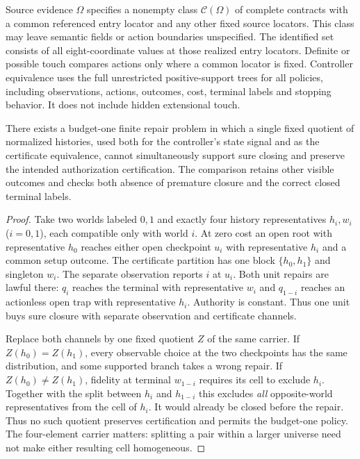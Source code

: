 Source evidence \(\Omega\) specifies a nonempty class \(\mathcal C(\Omega)\) of complete contracts with a common referenced entry locator and any other fixed source locators. This class may leave semantic fields or action boundaries unspecified. The identified set consists of all eight-coordinate values at those realized entry locators. Definite or possible touch compares actions only where a common locator is fixed. Controller equivalence uses the full unrestricted positive-support trees for all policies, including observations, actions, outcomes, cost, terminal labels and stopping behavior. It does not include hidden extensional touch.

\begin{proposition}\label{found:p01}

There exists a budget-one finite repair problem in which a single fixed quotient of normalized histories, used both for the controller's state signal and as the certificate equivalence, cannot simultaneously support sure closing and preserve the intended authorization certification. The comparison retains other visible outcomes and checks both absence of premature closure and the correct closed terminal labels.

\end{proposition}

\begin{proof}

Take two worlds labeled \(0,1\) and exactly four history representatives \(h_i,w_i\) (\(i=0,1\)), each compatible only with world \(i\). At zero cost an open root with representative \(h_0\) reaches either open checkpoint \(u_i\) with representative \(h_i\) and a common setup outcome. The certificate partition has one block \(\{h_0,h_1\}\) and singleton \(w_i\). The separate observation reports \(i\) at \(u_i\). Both unit repairs are lawful there: \(q_i\) reaches the terminal with representative \(w_i\) and \(q_{1-i}\) reaches an actionless open trap with representative \(h_i\). Authority is constant. Thus one unit buys sure closure with separate observation and certificate channels.

Replace both channels by one fixed quotient \(Z\) of the same carrier. If \(Z(h_0)=Z(h_1)\), every observable choice at the two checkpoints has the same distribution, and some supported branch takes a wrong repair. If \(Z(h_0)\ne Z(h_1)\), fidelity at terminal \(w_{1-i}\) requires its cell to exclude \(h_i\). Together with the split between \(h_i\) and \(h_{1-i}\) this excludes \emph{all} opposite-world representatives from the cell of \(h_i\). It would already be closed before the repair. Thus no such quotient preserves certification and permits the budget-one policy. The four-element carrier matters: splitting a pair within a larger universe need not make either resulting cell homogeneous.

\end{proof}

